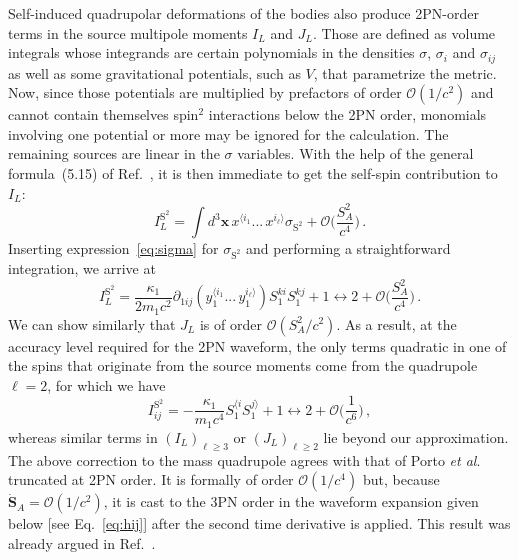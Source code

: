 \documentclass[aps, prd,
twocolumn,%
superscriptaddress,
showpacs, nofootinbib, eqsecnum, amsmath, amssymb, floatfix
]{revtex4}
\begin{document}
Self-induced quadrupolar deformations of the bodies also produce 2PN-order
terms in the source multipole moments $I_L$ and $J_L$. Those are defined as
volume integrals whose integrands are certain polynomials in the densities
$\sigma$, $\sigma_i$ and $\sigma_{ij}$ as well as some gravitational
potentials, such as $V$, that parametrize the metric. Now, since those
potentials are multiplied by prefactors of order $\mathcal{O}(1/c^2)$ and
cannot contain themselves spin${}^2$ interactions below the 2PN order,
monomials involving one potential or more may be ignored for the calculation.
The remaining sources are linear in the $\sigma$ variables. With the help of
the general formula~(5.15) of Ref.~\cite{Blanchet98}, it is then immediate to
get the self-spin contribution to $I_L$:
%
\begin{equation}
I_L^{\text{S}^2} =\int d^3\!\bm{x} \, x^{\langle i_1}\!\! ...\, x^{i_\ell
  \rangle}\sigma_{\text{S}^2}  +
\mathcal{O} \Big(\frac{S_A^2}{c^4} \Big) \, .
\end{equation}
%
Inserting expression~\eqref{eq:sigma} for $\sigma_{\text{S}^2}$ and
performing a straightforward integration, we arrive at
%
\begin{equation}
I_L^{\text{S}^2} = \frac{\kappa_1}{2m_1 c^2} \partial_{1ij}
(y_1^{\langle i_1}\! \! ...\, y_1^{i_\ell \rangle}) S_1^{ki} S_1^{kj} +  1
\leftrightarrow 2 + \mathcal{O} \Big( \frac{S_A^2}{c^4}\Big) \, .
\end{equation}
%
We can show similarly that $J_L$ is of order $\mathcal{O}(S_A^2/c^2)$. As a
result, at the accuracy level required for the 2PN waveform, the only terms
quadratic in one of the spins that originate from the source moments come
from the quadrupole $\ell=2$, for which we have
%
\begin{equation}
\label{eq:ISSresult}
I_{ij}^{\text{S}^2} = - \frac{\kappa_1}{m_1 c^4} S_1^{\langle i} S_1^{j\rangle} + 1
\leftrightarrow 2 + \mathcal{O} \Big( \frac{1}{c^6}\Big)\, ,
\end{equation}
%
whereas similar terms in $(I_L)_{\ell \ge 3}$ or $(J_L)_{\ell \ge
2}$ lie beyond our approximation. The above correction to the mass
quadrupole agrees with that of Porto \textit{et
al}.~\cite{Porto:2010zg} truncated at 2PN order. It is formally of
order $\mathcal{O}(1/c^4)$ but, because $\dot{\bm{S}}_A=
\mathcal{O}(1/c^2)$, it is cast to the 3PN order in the waveform
expansion given below [see Eq.~\eqref{eq:hij}] after the second time
derivative is applied. This result was already argued in
Ref.~\cite{Racine2008}.
\end{document}
